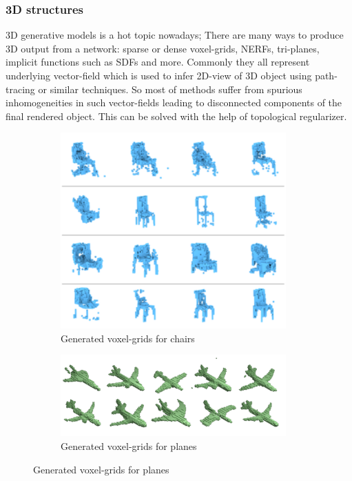 \subsubsection{3D structures}
3D generative models is a hot topic nowadays; There are many ways to produce 3D output from a network: sparse or dense voxel-grids, NERFs, tri-planes, implicit functions such as SDFs and more. Commonly they all represent underlying vector-field which is used to infer 2D-view of 3D object using path-tracing or similar techniques. So most of methods suffer from spurious inhomogeneities in such vector-fields leading to disconnected components of the final rendered object. This can be solved with the help of topological regularizer.
\begin{figure}[h]
\centering
\begin{subfigure}{0.5\textwidth}
  \centering
  \includegraphics[width=0.95\textwidth]{images/chairs.png}
  \caption{Generated voxel-grids for chairs}
  \label{fig:chairs}
\end{subfigure}%
\begin{subfigure}{0.5\textwidth}
  \centering
  \includegraphics[width=0.95\textwidth]{images/planes.png}
  \caption{Generated voxel-grids for planes}
  \label{fig:planes}
\end{subfigure}
\end{figure}
